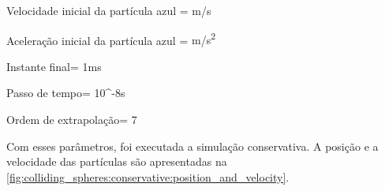 \begin{table}[h]
\begin{parametersdesc}{\textwidth}
	\item{Velocidade inicial da partícula azul}{\initial{\blueVelocity} = }{\si[per-mode=symbol]{\metre\per\second}}
	\item{Aceleração inicial da partícula azul}{\initial{\blueAcceleration} = }{\si[per-mode=symbol]{\metre\per\square\second}}
	\hline
	\item{Instante final}{\finalInstant = 1}{\si\milli\second} 
	\item{Passo de tempo}{\Dt = 10^{-8}}{\si\second}
	\item{Ordem de extrapolação}{\taylorOrder = 7}{\emptyUnit}
\end{parametersdesc}
\sourceMe 
\end{table}

Com esses parâmetros, foi executada a simulação conservativa. A posição e a velocidade das partículas são apresentadas na \cref{fig:colliding_spheres:conservative:position_and_velocity}.

